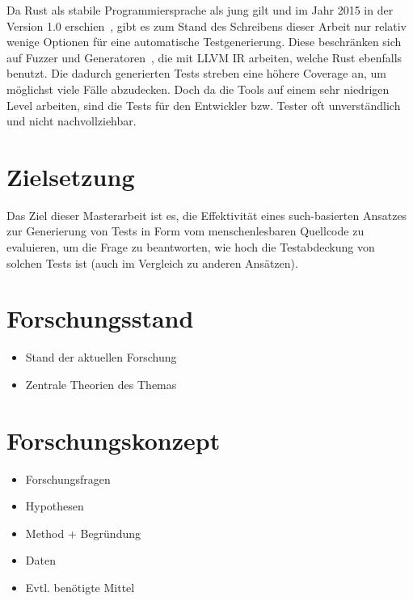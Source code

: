 \documentclass{article}
\begin{document}
Da Rust als stabile Programmiersprache als jung gilt und im Jahr 2015 in der Version 1.0 erschien~\cite{Rust10}, gibt es zum Stand des Schreibens dieser Arbeit nur relativ wenige Optionen für eine automatische Testgenerierung. Diese beschränken sich auf Fuzzer und Generatoren~\cite{cadar2008klee}, die mit LLVM IR arbeiten, welche Rust ebenfalls benutzt. Die dadurch generierten Tests streben eine höhere Coverage an, um möglichst viele Fälle abzudecken. Doch da die Tools auf einem sehr niedrigen Level arbeiten, sind die Tests für den Entwickler bzw. Tester oft unverständlich und nicht nachvollziehbar. 


\section{Zielsetzung}
Das Ziel dieser Masterarbeit ist es, die Effektivität eines such-basierten Ansatzes zur Generierung von Tests in Form vom menschenlesbaren Quellcode zu evaluieren, um die Frage zu beantworten, wie hoch die Testabdeckung von solchen Tests ist (auch im Vergleich zu anderen Ansätzen).


\section{Forschungsstand}
\begin{itemize}
    \item Stand der aktuellen Forschung
    \item Zentrale Theorien des Themas
\end{itemize}

\section{Forschungskonzept}
\begin{itemize}
    \item Forschungsfragen
    \item Hypothesen
    \item Method + Begründung
    \item Daten
    \item Evtl. benötigte Mittel
\end{itemize}
\end{document}

